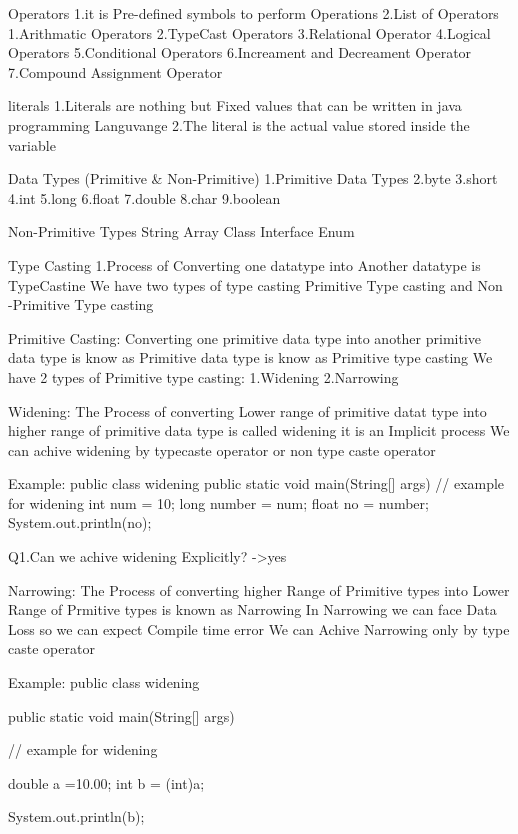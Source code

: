 Operators
1.it is Pre-defined symbols to perform Operations
2.List of Operators
  1.Arithmatic Operators
  2.TypeCast Operators
  3.Relational Operator
  4.Logical Operators
  5.Conditional Operators
  6.Increament and Decreament Operator
  7.Compound Assignment Operator

literals
1.Literals are nothing but Fixed values that can be written in java programming Languvange
2.The literal is the actual value stored inside the variable

Data Types (Primitive & Non-Primitive)
1.Primitive Data Types
2.byte
3.short
4.int
5.long
6.float
7.double
8.char
9.boolean

Non-Primitive Types
String
Array
Class
Interface
Enum

Type Casting
1.Process of Converting one datatype into Another datatype is TypeCastine
We have two types of type casting
Primitive Type casting and Non -Primitive Type casting

Primitive Casting:
   Converting one primitive data type into another primitive data type is know as Primitive data type is know as Primitive type casting
   We have 2 types of Primitive type casting:
         1.Widening
         2.Narrowing
    


    Widening:
           The Process of converting Lower range of primitive datat type into higher range of primitive data type is called widening
           it is an Implicit process
           We can achive widening by typecaste operator or non type caste operator

           Example:
           public class widening {
                  public static void main(String[] args) {
                   // example for widening
                    int num = 10;
                    long number = num;
                    float no = number;
                    System.out.println(no);
                 }
        }

    Q1.Can we achive widening Explicitly?
    ->yes

    Narrowing:
            The Process of converting higher Range of Primitive types into Lower Range of Prmitive types is known as Narrowing
            In Narrowing we can face Data Loss
            so we can expect Compile time error
            We can Achive Narrowing only by type caste operator

            Example:
             public class widening {
                  public static void main(String[] args) {
                   // example for widening

                      double a =10.00;
                      int b = (int)a;

                     System.out.println(b);
                   
                 }
               }

